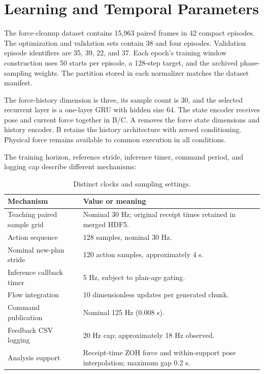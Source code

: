 \section{Learning and Temporal Parameters}
The force-cleanup dataset contains 15,963 paired frames in 42 compact episodes. The optimization and validation sets contain 38 and four episodes. Validation episode identifiers are 35, 39, 22, and 37. Each epoch's training window construction uses 50 starts per episode, a 128-step target, and the archived phase-sampling weights. The partition stored in each normalizer matches the dataset manifest.

The force-history dimension is three, its sample count is 30, and the selected recurrent layer is a one-layer GRU with hidden size 64. The state encoder receives pose and current force together in B/C. A removes the force state dimensions and history encoder. B retains the history architecture with zeroed conditioning. Physical force remains available to common execution in all conditions.

The training horizon, reference stride, inference timer, command period, and logging cap describe different mechanisms:
\begin{table}[tbp]\centering\small
\caption[Distinct clocks and sampling settings]{Distinct clocks and sampling settings.}
\label{tab:clock_definitions}
\begin{tabularx}{\textwidth}{P{0.39\textwidth}X}
\toprule Mechanism & Value or meaning \\ \midrule
Teaching paired sample grid & Nominal 30 Hz; original receipt times retained in merged HDF5. \\
Action sequence & 128 samples, nominal 30 Hz. \\
Nominal new-plan stride & 120 action samples, approximately 4 s. \\
Inference callback timer & 5 Hz, subject to plan-age gating. \\
Flow integration & 10 dimensionless updates per generated chunk. \\
Command publication & Nominal 125 Hz (0.008 s). \\
Feedback CSV logging & 20 Hz cap; approximately 18 Hz observed. \\
Analysis support & Receipt-time ZOH force and within-support pose interpolation; maximum gap 0.2 s. \\
\bottomrule
\end{tabularx}
\end{table}

